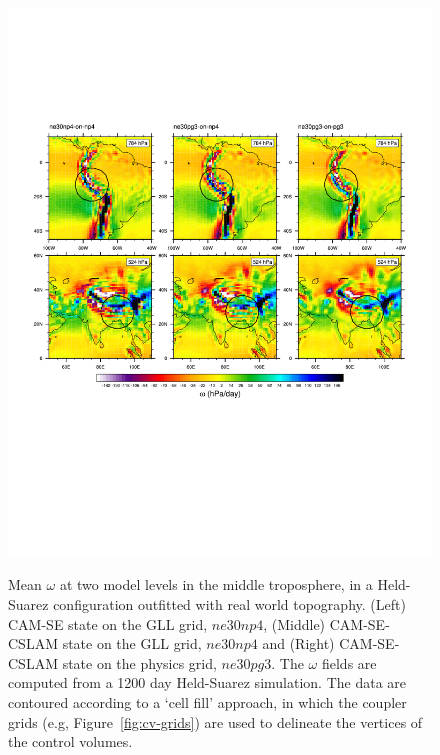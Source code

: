 \documentclass[twocol]{ametsoc}
\begin{document}
\begin{figure}[t]
\noindent\includegraphics[width=37pc,angle=0]{figs/FHS-contours-CROP.pdf}\\
\caption{Mean $\omega$ at two model levels in the middle troposphere, in a Held-Suarez configuration outfitted with real world topography. (Left) CAM-SE state on the GLL grid, $ne30np4$, (Middle) CAM-SE-CSLAM state on the GLL grid, $ne30np4$ and (Right) CAM-SE-CSLAM state on the physics grid, $ne30pg3$. The $\omega$ fields are computed from a 1200 day Held-Suarez simulation. The data are contoured according to a `cell fill' approach, in which the coupler grids (e.g, Figure~\ref{fig:cv-grids}) are used to delineate the vertices of the control volumes.} 
\label{fig:FHS-contours}
\end{figure}
\end{document}
